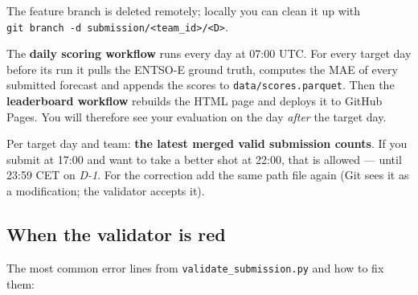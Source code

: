 \documentclass[
  english,
  letterpaper,
]{scrbook}
\begin{document}
The feature branch is deleted remotely; locally you can clean it up with
\texttt{git\ branch\ -d\ submission/\textless{}team\_id\textgreater{}/\textless{}D\textgreater{}}.

\begin{tcolorbox}[enhanced jigsaw, arc=.35mm, bottomrule=.15mm, bottomtitle=1mm, breakable, colback=white, colbacktitle=quarto-callout-note-color!10!white, colframe=quarto-callout-note-color-frame, coltitle=black, left=2mm, leftrule=.75mm, opacityback=0, opacitybacktitle=0.6, rightrule=.15mm, title=\textcolor{quarto-callout-note-color}{\faInfo}\hspace{0.5em}{What happens after the merge?}, titlerule=0mm, toprule=.15mm, toptitle=1mm]

The \textbf{daily scoring workflow} runs every day at 07:00 UTC. For
every target day before its run it pulls the ENTSO-E ground truth,
computes the MAE of every submitted forecast and appends the scores to
\texttt{data/scores.parquet}. Then the \textbf{leaderboard workflow}
rebuilds the HTML page and deploys it to GitHub Pages. You will
therefore see your evaluation on the day \emph{after} the target day.

\end{tcolorbox}

Per target day and team: \textbf{the latest merged valid submission
counts}. If you submit at 17:00 and want to take a better shot at 22:00,
that is allowed --- until 23:59 CET on \emph{D-1}. For the correction
add the same path file again (Git sees it as a modification; the
validator accepts it).

\subsection{When the validator is red}\label{sec-validator-rot}

The most common error lines from \texttt{validate\_submission.py} and
how to fix them:
\end{document}
